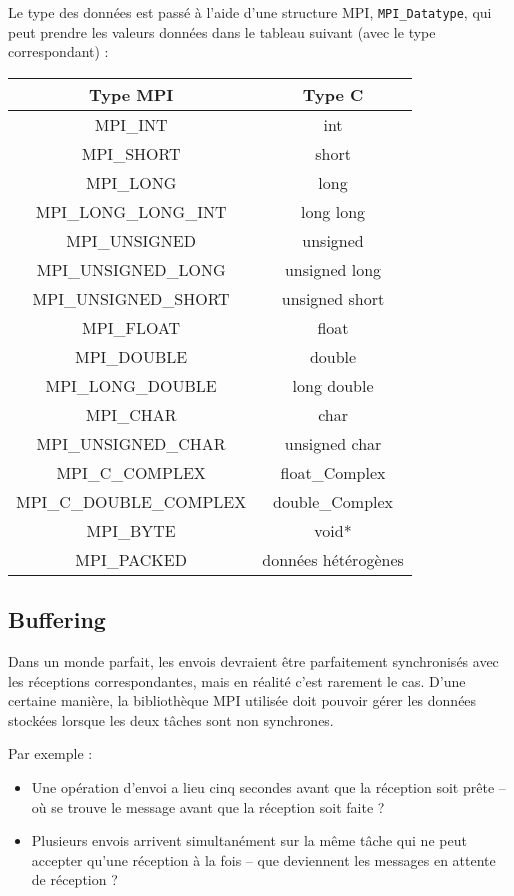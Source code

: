 \documentclass[11pt,a4paper]{article}
\begin{document}
Le type des données est passé à l'aide d'une structure MPI, \texttt{MPI\_Datatype}, qui peut prendre les valeurs données dans le
tableau suivant (avec le type correspondant) :

\begin{center}
\begin{tabular}{|c|c|}\hline
Type MPI & Type C \\ \hline
MPI\_INT & int \\
MPI\_SHORT & short \\
MPI\_LONG & long \\
MPI\_LONG\_LONG\_INT & long long \\
MPI\_UNSIGNED & unsigned \\
MPI\_UNSIGNED\_LONG & unsigned long \\
MPI\_UNSIGNED\_SHORT & unsigned short \\
MPI\_FLOAT & float \\
MPI\_DOUBLE & double \\
MPI\_LONG\_DOUBLE & long double \\
MPI\_CHAR & char \\
MPI\_UNSIGNED\_CHAR & unsigned char \\
MPI\_C\_COMPLEX & float\_Complex \\
MPI\_C\_DOUBLE\_COMPLEX & double\_Complex \\
MPI\_BYTE & void* \\
MPI\_PACKED & données hétérogènes\\ \hline
\end{tabular}
\end{center}

\subsection{Buffering}

Dans un monde parfait, les envois devraient être parfaitement synchronisés avec les réceptions correspondantes, mais 
en réalité c'est rarement le cas. D'une certaine manière, la bibliothèque MPI utilisée doit pouvoir gérer les données stockées lorsque les deux tâches sont non synchrones. 

Par exemple :
\begin{itemize}
\item Une opération d'envoi a lieu cinq secondes avant que la réception soit prête -- où se trouve le message avant que la
réception soit faite ?
\item Plusieurs envois arrivent simultanément sur la même tâche qui ne peut accepter qu'une réception à la fois -- que deviennent
les messages en attente de réception ?
\end{itemize}
\end{document}
